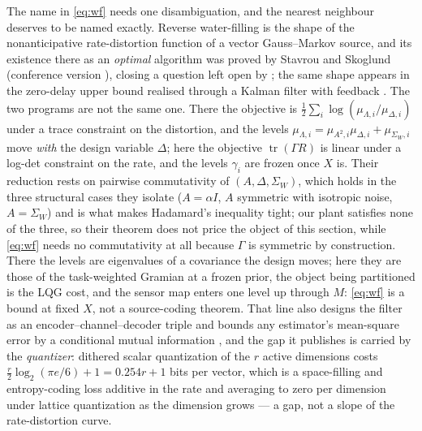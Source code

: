 The name in \eqref{eq:wf} needs one disambiguation, and the nearest neighbour
deserves to be named exactly. Reverse water-filling is the shape of the
nonanticipative rate-distortion function of a vector Gauss--Markov source, and its
existence there as an \emph{optimal} algorithm was proved by Stavrou and Skoglund
\cite{stavrou2022tac} (conference version \cite{stavrou2018asymptotic}), closing a
question left open by \cite{tatikonda2004stochastic}; the same shape appears in the
zero-delay upper bound realised through a Kalman filter with feedback
\cite{stavrou2017itw}. The two programs are not the same one. There the objective
is $\tfrac12\sum_i\log(\mu_{\Lambda,i}/\mu_{\Delta,i})$ under a trace constraint on
the distortion, and the levels $\mu_{\Lambda,i}=\mu_{A^2,i}\mu_{\Delta,i}
+\mu_{\Sigma_W,i}$ move \emph{with} the design variable $\Delta$; here the objective
$\operatorname{tr}(\Gamma R)$ is linear under a log-det constraint on the rate, and
the levels $\gamma_i$ are frozen once $X$ is. Their reduction rests on pairwise
commutativity of $(A,\Delta,\Sigma_W)$, which holds in the three structural cases
they isolate ($A=\alpha I$, $A$ symmetric with isotropic noise, $A=\Sigma_W$) and is
what makes Hadamard's inequality tight; our plant satisfies none of the three, so
their theorem does not price the object of this section, while \eqref{eq:wf} needs
no commutativity at all because $\Gamma$ is symmetric by construction. There the
levels are eigenvalues of a covariance the design moves; here they are those of the
task-weighted Gramian at a frozen prior, the object being partitioned is the LQG
cost, and the sensor map enters one level up through $M$: \eqref{eq:wf} is a bound
at fixed $X$, not a source-coding theorem.
That line also designs the filter as an encoder--channel--decoder triple and bounds
any estimator's mean-square error by a conditional mutual information
\cite{stavrou2016estimation}, and the gap it publishes is carried by the
\emph{quantizer}: dithered scalar quantization of the $r$ active dimensions costs
$\tfrac r2\log_2(\pi e/6)+1=0.254r+1$ bits per vector, which is a space-filling and
entropy-coding loss additive in the rate and averaging to zero per dimension under
lattice quantization as the dimension grows \cite{stavrou2018zerodelay} --- a gap,
not a slope of the rate-distortion curve.

